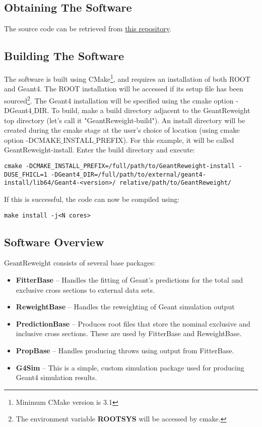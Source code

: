 \documentclass[12pt]{article}
\begin{document}
\subsection{Obtaining The Software}

The source code can be retrieved from \href{https://github.com/calcuttj/GeantReweight}{this repository}.

\subsection{Building The Software}

The software is built using CMake\footnote{Minimum CMake version is 3.1}, and requires an installation of both ROOT and Geant4. The ROOT installation will be accessed if its setup file has been sourced\footnote{The environment variable \textbf{ROOTSYS} will be accessed by cmake.}. The Geant4 installation will be specified using the cmake option -DGeant4$\_$DIR. To build, make a build directory adjacent to the GeantReweight top directory (let's call it "GeantReweight-build"). An install directory will be created during the cmake stage at the user's choice of location (using cmake option -DCMAKE$\_$INSTALL$\_$PREFIX). For this example, it will be called GeantReweight-install. Enter the build directory and execute:
\begin{lstlisting}
cmake -DCMAKE_INSTALL_PREFIX=/full/path/to/GeantReweight-install -DUSE_FHICL=1 -DGeant4_DIR=/full/path/to/external/geant4-install/lib64/Geant4-<version>/ relative/path/to/GeantReweight/
\end{lstlisting}

If this is successful, the code can now be compiled using:
\begin{lstlisting}
make install -j<N cores>
\end{lstlisting}

\subsection{Software Overview}

GeantReweight consists of several base packages:
\begin{itemize}
	\item \textbf{FitterBase} -- Handles the fitting of Geant's predictions for the total and exclusive cross sections to external data sets.
	\item \textbf{ReweightBase} -- Handles the reweighting of Geant simulation output
	\item \textbf{PredictionBase} -- Produces root files that store the nominal exclusive and inclusive cross sections. These are used by FitterBase and ReweightBase. 
	\item \textbf{PropBase} -- Handles producing throws using output from FitterBase.
	\item \textbf{G4Sim} -- This is a simple, custom simulation package used for producing Geant4 simulation results.
\end{itemize}
\end{document}
